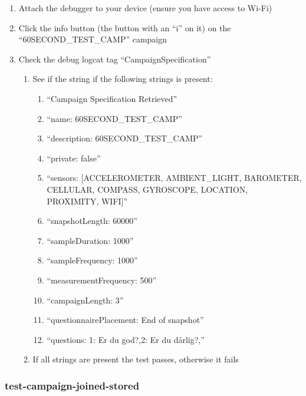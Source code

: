 \begin{enumerate}
    \item Attach the debugger to your device (ensure you have access to Wi-Fi)
    \item Click the info button (the button with an ``i'' on it) on the ``60SECOND\_TEST\_CAMP'' campaign
    \item Check the debug logcat tag ``CampaignSpecification''
        \begin{enumerate}
            \item See if the string if the following strings is present:
                \begin{enumerate}
                        \item ``Campaign Specification Retrieved''
                        \item ``name: 60SECOND\_TEST\_CAMP''
                        \item ``description: 60SECOND\_TEST\_CAMP''
                        \item ``private: false'' 
                        \item ``sensors: [ACCELEROMETER, AMBIENT\_LIGHT, BAROMETER, CELLULAR, COMPASS, GYROSCOPE, LOCATION, PROXIMITY, WIFI]''
                        \item ``snapshotLength: 60000''
                        \item ``sampleDuration: 1000''
                        \item ``sampleFrequency: 1000''
                        \item ``measurementFrequency: 500''
                        \item ``campaignLength: 3''
                        \item ``questionnairePlacement: End of snapshot''
                        \item ``questions: 1: Er du god?,2: Er du dårlig?,''
                \end{enumerate}
            \item If all strings are present the test passes, otherwise it fails
        \end{enumerate}
\end{enumerate}

\subsubsection{test-campaign-joined-stored}

